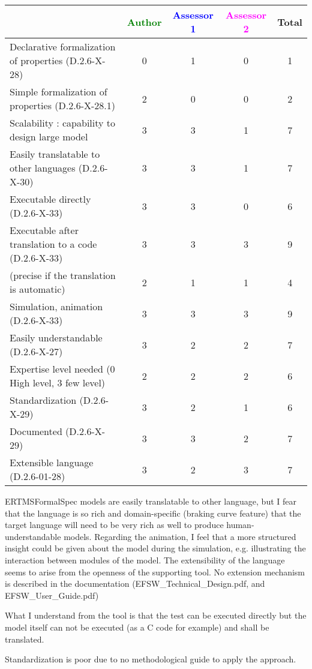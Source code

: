 \begin{tabular}{|l | c | c | c | c|}
\hline
& \textcolor{green}{Author} & \textcolor{blue}{Assessor 1} & \textcolor{magenta}{Assessor 2} & Total \\
\hline
Declarative formalization of properties (D.2.6-X-28) & 0 & 1 & 0 & 1 \\
\hline
Simple formalization of properties (D.2.6-X-28.1) & 2 & 0 & 0 & 2 \\
\hline
Scalability : capability to design large model & 3 & 3 & 1 & 7 \\
\hline
Easily translatable to other languages (D.2.6-X-30) & 3 & 3 & 1 & 7 \\
\hline
Executable directly (D.2.6-X-33) & 3 & 3 & 0 & 6 \\
\hline
Executable after translation to a code (D.2.6-X-33) & 3 & 3 & 3 & 9 \\
(precise if the translation is automatic) & 2 & 1 & 1 & 4 \\
\hline
Simulation, animation (D.2.6-X-33) & 3 & 3 & 3 & 9 \\
\hline
Easily understandable (D.2.6-X-27) & 3 & 2 & 2 & 7 \\
\hline
Expertise level needed (0 High level, 3 few level) & 2 & 2 & 2 & 6 \\
\hline
Standardization (D.2.6-X-29) & 3 & 2 & 1 & 6 \\
\hline
Documented (D.2.6-X-29) & 3 & 3 & 2 & 7 \\
\hline
Extensible language (D.2.6-01-28) & 3 & 2 & 3 & 7 \\
\hline
\end{tabular}

\begin{assessor1}
ERTMSFormalSpec models are easily translatable to other language, but I fear that the language is so rich and domain-specific (braking curve feature) that the target language will need to be very rich as well to produce human-understandable models. Regarding the animation, I feel that a more structured insight could be given about the model during the simulation, e.g. illustrating the interaction between modules of the model. The extensibility of the language seems to arise from the openness of the supporting tool. No extension mechanism is described in the documentation (EFSW\_Technical\_Design.pdf, and EFSW\_User\_Guide.pdf)
\end{assessor1}


\begin{assessor2}
What I understand from the tool is that the test can be executed directly but the model itself can not be executed (as a C code for example)  and shall be translated.

Standardization is poor due to no methodological guide to apply the approach.
\end{assessor2}

